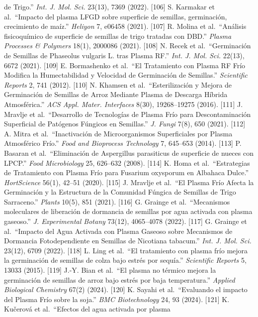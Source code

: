 \documentclass[
  10pt,
  letterpaper,
  twocolumn]{article}
\begin{document}
de Trigo.'' \emph{Int. J. Mol. Sci.} 23(13), 7369 (2022). {[}106{]} S.
Karmakar et al.~``Impacto del plasma LFGD sobre superficie de semillas,
germinación, crecimiento de maíz.'' \emph{Heliyon} 7, e06458 (2021).
{[}107{]} R. Molina et al.~``Análisis fisicoquímico de superficie de
semillas de trigo tratadas con DBD.'' \emph{Plasma Processes \&
Polymers} 18(1), 2000086 (2021). {[}108{]} N. Recek et al.~``Germinación
de Semillas de Phaseolus vulgaris L. tras Plasma RF.'' \emph{Int. J.
Mol. Sci.} 22(13), 6672 (2021). {[}109{]} E. Bormashenko et al.~``El
Tratamiento con Plasma RF Frío Modifica la Humectabilidad y Velocidad de
Germinación de Semillas.'' \emph{Scientific Reports} 2, 741 (2012).
{[}110{]} N. Khamsen et al.~``Esterilización y Mejora de Germinación de
Semillas de Arroz Mediante Plasma de Descarga Híbrida Atmosférica.''
\emph{ACS Appl. Mater. Interfaces} 8(30), 19268--19275 (2016). {[}111{]}
J. Mravlje et al.~``Desarrollo de Tecnologías de Plasma Frío para
Descontaminación Superficial de Patógenos Fúngicos en Semillas.''
\emph{J. Fungi} 7(8), 650 (2021). {[}112{]} A. Mitra et
al.~``Inactivación de Microorganismos Superficiales por Plasma
Atmosférico Frío.'' \emph{Food and Bioprocess Technology} 7, 645--653
(2014). {[}113{]} P. Basaran et al.~``Eliminación de Aspergillus
parasiticus de superficie de nueces con LPCP.'' \emph{Food Microbiology}
25, 626--632 (2008). {[}114{]} K. Homa et al.~``Estrategias de
Tratamiento con Plasma Frío para Fusarium oxysporum en Albahaca Dulce.''
\emph{HortScience} 56(1), 42--51 (2020). {[}115{]} J. Mravlje et
al.~``El Plasma Frío Afecta la Germinación y la Estructura de la
Comunidad Fúngica de Semillas de Trigo Sarraceno.'' \emph{Plants} 10(5),
851 (2021). {[}116{]} G. Grainge et al.~``Mecanismos moleculares de
liberación de dormancia de semillas por agua activada con plasma
gaseoso.'' \emph{J. Experimental Botany} 73(12), 4065--4078 (2022).
{[}117{]} G. Grainge et al.~``Impacto del Agua Activada con Plasma
Gaseoso sobre Mecanismos de Dormancia Fotodependiente en Semillas de
Nicotiana tabacum.'' \emph{Int. J. Mol. Sci.} 23(12), 6709 (2022).
{[}118{]} L. Ling et al.~``El tratamiento con plasma frío mejora la
germinación de semillas de colza bajo estrés por sequía.''
\emph{Scientific Reports} 5, 13033 (2015). {[}119{]} J.-Y. Bian et
al.~``El plasma no térmico mejora la germinación de semillas de arroz
bajo estrés por baja temperatura.'' \emph{Applied Biological Chemistry}
67(2) (2024). {[}120{]} K. Sayahi et al.~``Evaluando el impacto del
Plasma Frío sobre la soja.'' \emph{BMC Biotechnology} 24, 93 (2024).
{[}121{]} K. Kučerová et al.~``Efectos del agua activada por plasma
\end{document}
